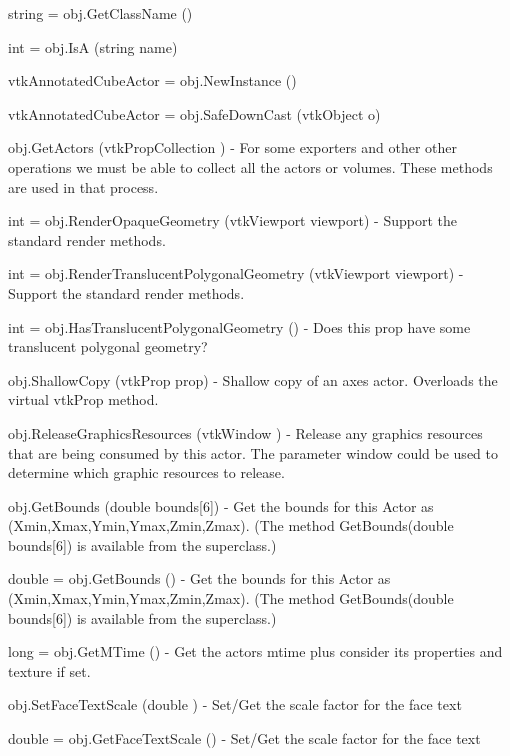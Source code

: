\begin{DoxyItemize}
\item {\ttfamily string = obj.\-Get\-Class\-Name ()}  
\item {\ttfamily int = obj.\-Is\-A (string name)}  
\item {\ttfamily vtk\-Annotated\-Cube\-Actor = obj.\-New\-Instance ()}  
\item {\ttfamily vtk\-Annotated\-Cube\-Actor = obj.\-Safe\-Down\-Cast (vtk\-Object o)}  
\item {\ttfamily obj.\-Get\-Actors (vtk\-Prop\-Collection )} -\/ For some exporters and other other operations we must be able to collect all the actors or volumes. These methods are used in that process.  
\item {\ttfamily int = obj.\-Render\-Opaque\-Geometry (vtk\-Viewport viewport)} -\/ Support the standard render methods.  
\item {\ttfamily int = obj.\-Render\-Translucent\-Polygonal\-Geometry (vtk\-Viewport viewport)} -\/ Support the standard render methods.  
\item {\ttfamily int = obj.\-Has\-Translucent\-Polygonal\-Geometry ()} -\/ Does this prop have some translucent polygonal geometry?  
\item {\ttfamily obj.\-Shallow\-Copy (vtk\-Prop prop)} -\/ Shallow copy of an axes actor. Overloads the virtual vtk\-Prop method.  
\item {\ttfamily obj.\-Release\-Graphics\-Resources (vtk\-Window )} -\/ Release any graphics resources that are being consumed by this actor. The parameter window could be used to determine which graphic resources to release.  
\item {\ttfamily obj.\-Get\-Bounds (double bounds\mbox{[}6\mbox{]})} -\/ Get the bounds for this Actor as (Xmin,Xmax,Ymin,Ymax,Zmin,Zmax). (The method Get\-Bounds(double bounds\mbox{[}6\mbox{]}) is available from the superclass.)  
\item {\ttfamily double = obj.\-Get\-Bounds ()} -\/ Get the bounds for this Actor as (Xmin,Xmax,Ymin,Ymax,Zmin,Zmax). (The method Get\-Bounds(double bounds\mbox{[}6\mbox{]}) is available from the superclass.)  
\item {\ttfamily long = obj.\-Get\-M\-Time ()} -\/ Get the actors mtime plus consider its properties and texture if set.  
\item {\ttfamily obj.\-Set\-Face\-Text\-Scale (double )} -\/ Set/\-Get the scale factor for the face text  
\item {\ttfamily double = obj.\-Get\-Face\-Text\-Scale ()} -\/ Set/\-Get the scale factor for the face text  

\end{DoxyItemize}
